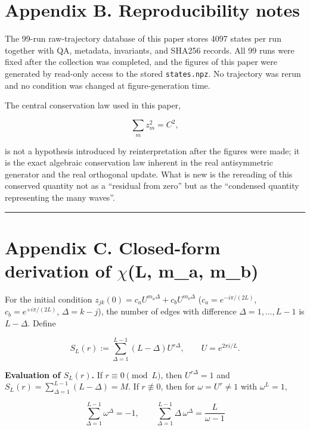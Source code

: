 \documentclass[
  a4paper,
]{article}
\begin{document}
\section{Appendix B. Reproducibility
notes}\label{appendix-b.-reproducibility-notes}

The 99-run raw-trajectory database of this paper stores 4097 states per
run together with QA, metadata, invariants, and SHA256 records. All 99
runs were fixed after the collection was completed, and the figures of
this paper were generated by read-only access to the stored
\texttt{states.npz}. No trajectory was rerun and no condition was
changed at figure-generation time.

The central conservation law used in this paper,

\[
\sum_mz_m^2=C^2,
\]

is not a hypothesis introduced by reinterpretation after the figures
were made; it is the exact algebraic conservation law inherent in the
real antisymmetric generator and the real orthogonal update. What is new
is the rereading of this conserved quantity not as a ``residual from
zero'' but as the ``condensed quantity representing the many waves''.

\begin{center}\rule{0.5\linewidth}{0.5pt}\end{center}

\section{\texorpdfstring{Appendix C. Closed-form derivation of
\(\chi\)(L, m\_a,
m\_b)}{Appendix C. Closed-form derivation of \textbackslash chi(L, m\_a, m\_b)}}\label{appendix-c.-closed-form-derivation-of-chil-m_a-m_b}

For the initial condition
\(z_{jk}(0)=c_aU^{m_a\Delta}+c_bU^{m_b\Delta}\) (\(c_a=e^{-i\pi/(2L)}\),
\(c_b=e^{+i\pi/(2L)}\), \(\Delta=k-j\)), the number of edges with
difference \(\Delta=1,\ldots,L-1\) is \(L-\Delta\). Define

\[
S_L(r):=\sum_{\Delta=1}^{L-1}(L-\Delta)U^{r\Delta},
\qquad U=e^{2\pi i/L}.
\]

\textbf{Evaluation of \(S_L(r)\).} If \(r\equiv0\pmod L\), then
\(U^{r\Delta}=1\) and \(S_L(r)=\sum_{\Delta=1}^{L-1}(L-\Delta)=M\). If
\(r\not\equiv0\), then for \(\omega=U^r\neq1\) with \(\omega^L=1\),

\[
\sum_{\Delta=1}^{L-1}\omega^\Delta=-1,
\qquad
\sum_{\Delta=1}^{L-1}\Delta\,\omega^\Delta=\frac{L}{\omega-1}
\]
\end{document}
